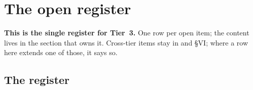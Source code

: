 %
%

\section{The open register}
\label{part:register}

\textbf{This is the single register for Tier~3.} One row per open item; the
content lives in the section that owns it. Cross-tier items stay in
 and  \S VI; where a row here extends one of
those, it says so.

\subsection{The register}
\label{sec:register}

